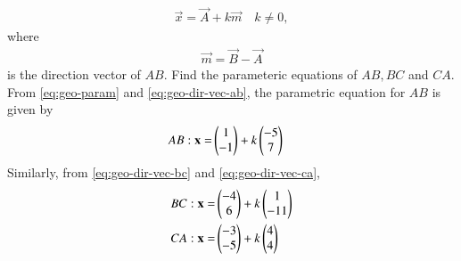 \begin{enumerate}[label=\thesubsection.\arabic*.,ref=\thesubsection.\theenumi]
		\begin{align}
			\label{eq:geo-param}
			\vec{x}=\vec{A}+k\vec{m} \quad k \ne 0,
		\end{align}
		where
		\begin{align}
\vec{m}=\vec{B}-\vec{A}
		\end{align}
is the direction vector of $AB$.
Find the parameteric equations of $AB, BC$ and $CA$.
\\
\solution
From 
			\eqref{eq:geo-param} and
		\eqref{eq:geo-dir-vec-ab},
the parametric equation for $AB$ is given by
\begin{align}
AB: \mathbf{x} = &\begin{pmatrix}1\\-1\end{pmatrix} + k \begin{pmatrix}-5\\7\end{pmatrix}
\end{align}
Similarly, from 
		\eqref{eq:geo-dir-vec-bc} and
		\eqref{eq:geo-dir-vec-ca},
\begin{align}
BC: \mathbf{x} = &\begin{pmatrix}-4\\6\end{pmatrix} + k \begin{pmatrix}1\\-11\end{pmatrix}\\
CA: \mathbf{x} = &\begin{pmatrix}-3\\-5\end{pmatrix} + k \begin{pmatrix}4\\4\end{pmatrix}
\end{align}


\end{enumerate}
